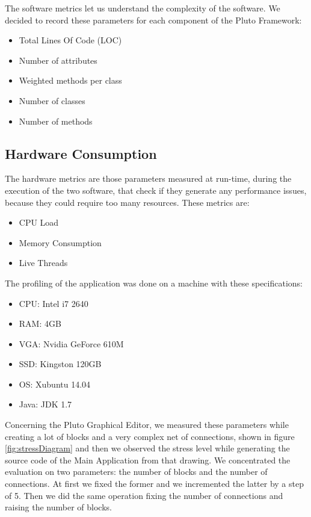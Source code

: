 The software metrics let us understand the complexity of the software.
We decided to record these parameters for each component of the Pluto Framework:

\begin{itemize}
\item Total Lines Of Code (LOC)
\item Number of attributes
\item Weighted methods per class
\item Number of classes
\item Number of methods
\end{itemize}

\subsection{Hardware Consumption}

The hardware metrics are those parameters measured at run-time, during the execution of the two software, that check if they generate any performance issues, because they could require too many resources. These metrics are:

\begin{itemize}
\item CPU Load
\item Memory Consumption
\item Live Threads
\end{itemize}

The profiling of the application was done on a machine with these specifications:

\begin{itemize}
\item CPU: Intel i7 2640
\item RAM: 4GB
\item VGA: Nvidia GeForce 610M
\item SSD: Kingston 120GB
\item OS: Xubuntu 14.04
\item Java: JDK 1.7
\end{itemize}

Concerning the Pluto Graphical Editor, we measured these parameters while creating a lot of blocks and a very complex net of connections, shown in figure \ref{fig:stressDiagram} and then we observed the stress level while generating the source code of the Main Application from that drawing. 
We concentrated the evaluation on two parameters: the number of blocks and the number of connections.
At first we fixed the former and we incremented the latter by a step of 5. Then we did the same operation fixing the number of connections and raising the number of blocks.

